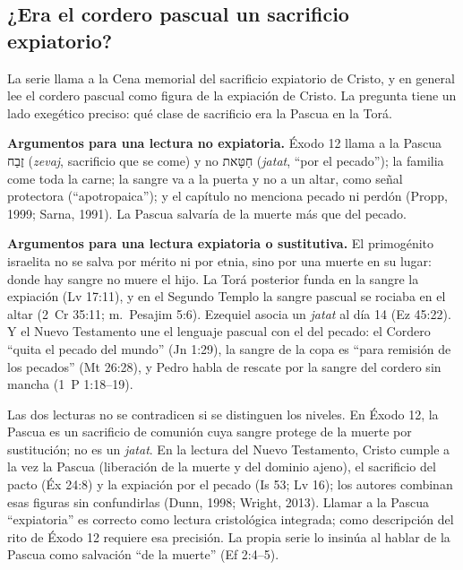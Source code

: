 \documentclass[11pt,letterpaper]{article}
\newcommand{\heb}[1]{\mbox{\foreignlanguage{hebrew}{#1}}}
\begin{document}
\subsection{¿Era el cordero pascual un sacrificio expiatorio?}
La serie llama a la Cena memorial del sacrificio expiatorio de Cristo, y en general lee el cordero pascual como figura de la expiación de Cristo. La pregunta tiene un lado exegético preciso: qué clase de sacrificio era la Pascua en la Torá.

\textbf{Argumentos para una lectura no expiatoria.} Éxodo 12 llama a la Pascua \heb{זֶבַח} (\emph{zevaj}, sacrificio que se come) y no \heb{חַטָּאת} (\emph{jatat}, ``por el pecado''); la familia come toda la carne; la sangre va a la puerta y no a un altar, como señal protectora (``apotropaica''); y el capítulo no menciona pecado ni perdón (Propp, 1999; Sarna, 1991). La Pascua salvaría de la muerte más que del pecado.

\textbf{Argumentos para una lectura expiatoria o sustitutiva.} El primogénito israelita no se salva por mérito ni por etnia, sino por una muerte en su lugar: donde hay sangre no muere el hijo. La Torá posterior funda en la sangre la expiación (Lv 17:11), y en el Segundo Templo la sangre pascual se rociaba en el altar (2~Cr 35:11; m.~Pesajim 5:6). Ezequiel asocia un \emph{jatat} al día 14 (Ez 45:22). Y el Nuevo Testamento une el lenguaje pascual con el del pecado: el Cordero ``quita el pecado del mundo'' (Jn 1:29), la sangre de la copa es ``para remisión de los pecados'' (Mt 26:28), y Pedro habla de rescate por la sangre del cordero sin mancha (1~P 1:18--19).

\begin{nota}
Las dos lecturas no se contradicen si se distinguen los niveles. En Éxodo 12, la Pascua es un sacrificio de comunión cuya sangre protege de la muerte por sustitución; no es un \emph{jatat}. En la lectura del Nuevo Testamento, Cristo cumple a la vez la Pascua (liberación de la muerte y del dominio ajeno), el sacrificio del pacto (Éx 24:8) y la expiación por el pecado (Is 53; Lv 16); los autores combinan esas figuras sin confundirlas (Dunn, 1998; Wright, 2013). Llamar a la Pascua ``expiatoria'' es correcto como lectura cristológica integrada; como descripción del rito de Éxodo 12 requiere esa precisión. La propia serie lo insinúa al hablar de la Pascua como salvación ``de la muerte'' (Ef 2:4--5).
\end{nota}

\end{document}
